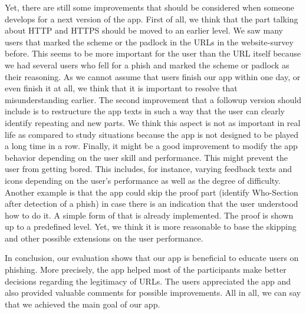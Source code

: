 Yet, there are still some improvements that should be considered when someone develops for a next version of the app.
First of all, we think that the part talking about HTTP and HTTPS should be moved to an earlier level.
We saw many users that marked the scheme or the padlock in the URLs in the website-survey before.
This seems to be more important for the user than the URL itself because we had several users who fell for a phish and marked the scheme or padlock as their reasoning.
As we cannot assume that users finish our app within one day, or even finish it at all, we think that it is important to resolve that misunderstanding earlier.
The second improvement that a followup version should include is to restructure the app texts in such a way that the user can clearly identify repeating and new parts.
We think this aspect is not as important in real life as compared to study situations because the app is not designed to be played a long time in a row.
Finally, it might be a good improvement to modify the app behavior depending on the user skill and performance.
This might prevent the user from getting bored.
This includes, for instance, varying feedback texts and icons depending on the user's performance as well as the degree of difficulty.
Another example is that the app could skip the proof part (identify Who-Section after detection of a phish) in case there is an indication that the user understood how to do it.
A simple form of that is already implemented.
The proof is shown up to a predefined level.
Yet, we think it is more reasonable to base the skipping and other possible extensions on the user performance. 

In conclusion, our evaluation shows that our app is beneficial to educate users on phishing. More precisely, the app helped most of the participants make better decisions regarding the legitimacy of  URLs. The users appreciated the app and also provided valuable comments for possible improvements. All in all, we can say that we achieved the main goal of our app.
